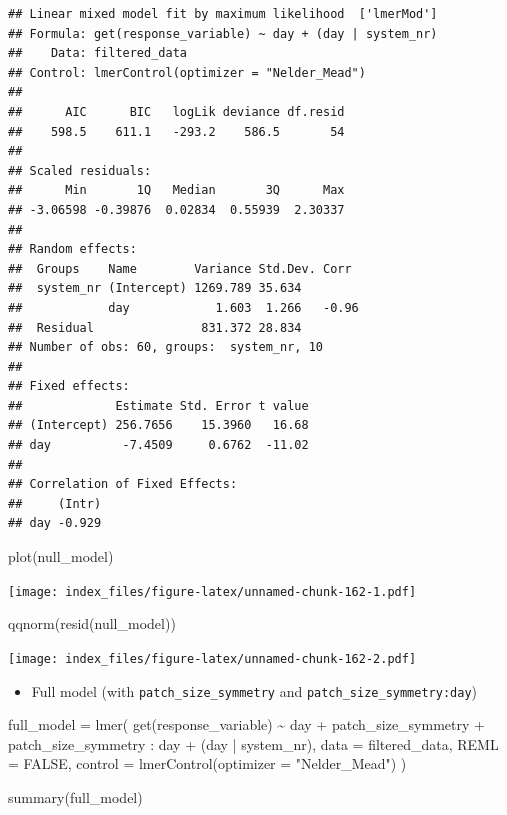 \documentclass[
]{article}
\newenvironment{Shaded}{\begin{snugshade}}{\end{snugshade}}
\newcommand{\AttributeTok}[1]{\textcolor[rgb]{0.77,0.63,0.00}{#1}}
\newcommand{\ConstantTok}[1]{\textcolor[rgb]{0.00,0.00,0.00}{#1}}
\newcommand{\FunctionTok}[1]{\textcolor[rgb]{0.00,0.00,0.00}{#1}}
\newcommand{\NormalTok}[1]{#1}
\newcommand{\OtherTok}[1]{\textcolor[rgb]{0.56,0.35,0.01}{#1}}
\newcommand{\SpecialCharTok}[1]{\textcolor[rgb]{0.00,0.00,0.00}{#1}}
\newcommand{\StringTok}[1]{\textcolor[rgb]{0.31,0.60,0.02}{#1}}
\providecommand{\tightlist}{%
  \setlength{\itemsep}{0pt}\setlength{\parskip}{0pt}}
\begin{document}
\begin{verbatim}
## Linear mixed model fit by maximum likelihood  ['lmerMod']
## Formula: get(response_variable) ~ day + (day | system_nr)
##    Data: filtered_data
## Control: lmerControl(optimizer = "Nelder_Mead")
## 
##      AIC      BIC   logLik deviance df.resid 
##    598.5    611.1   -293.2    586.5       54 
## 
## Scaled residuals: 
##      Min       1Q   Median       3Q      Max 
## -3.06598 -0.39876  0.02834  0.55939  2.30337 
## 
## Random effects:
##  Groups    Name        Variance Std.Dev. Corr 
##  system_nr (Intercept) 1269.789 35.634        
##            day            1.603  1.266   -0.96
##  Residual               831.372 28.834        
## Number of obs: 60, groups:  system_nr, 10
## 
## Fixed effects:
##             Estimate Std. Error t value
## (Intercept) 256.7656    15.3960   16.68
## day          -7.4509     0.6762  -11.02
## 
## Correlation of Fixed Effects:
##     (Intr)
## day -0.929
\end{verbatim}

\begin{Shaded}
\begin{Highlighting}[]
\FunctionTok{plot}\NormalTok{(null\_model)}
\end{Highlighting}
\end{Shaded}

\texttt{[image: index\_files/figure-latex/unnamed-chunk-162-1.pdf]}

\begin{Shaded}
\begin{Highlighting}[]
\FunctionTok{qqnorm}\NormalTok{(}\FunctionTok{resid}\NormalTok{(null\_model))}
\end{Highlighting}
\end{Shaded}

\texttt{[image: index\_files/figure-latex/unnamed-chunk-162-2.pdf]}

\begin{itemize}
\tightlist
\item
  Full model (with \texttt{patch\_size\_symmetry} and
  \texttt{patch\_size\_symmetry:day})
\end{itemize}

\begin{Shaded}
\begin{Highlighting}[]
\NormalTok{full\_model }\OtherTok{=} \FunctionTok{lmer}\NormalTok{(}
  \FunctionTok{get}\NormalTok{(response\_variable) }\SpecialCharTok{\textasciitilde{}}
\NormalTok{    day }\SpecialCharTok{+} 
\NormalTok{    patch\_size\_symmetry }\SpecialCharTok{+}
\NormalTok{    patch\_size\_symmetry }\SpecialCharTok{:}\NormalTok{ day }\SpecialCharTok{+} 
\NormalTok{    (day }\SpecialCharTok{|}\NormalTok{ system\_nr), }
  \AttributeTok{data =}\NormalTok{ filtered\_data,}
  \AttributeTok{REML =} \ConstantTok{FALSE}\NormalTok{,}
  \AttributeTok{control =} \FunctionTok{lmerControl}\NormalTok{(}\AttributeTok{optimizer =} \StringTok{"Nelder\_Mead"}\NormalTok{)}
\NormalTok{)}

\FunctionTok{summary}\NormalTok{(full\_model)}
\end{Highlighting}
\end{Shaded}
\end{document}
